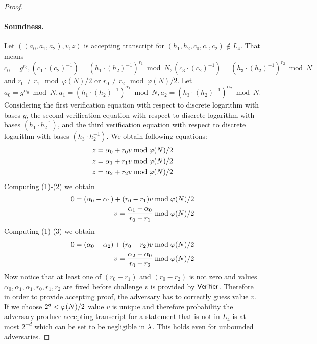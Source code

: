 \begin{proof}
\paragraph{Soundness.} Let $((a_0, a_1, a_2), v, z)$ is accepting transcript for $(h_1, h_2, c_0, c_1, c_2) \notin L_4$. That means $c_0 = g^{r_0}, (c_1\cdot (c_2)^{-1}) = (h_1\cdot (h_2)^{-1})^{r_1} \bmod N, (c_3\cdot (c_2)^{-1}) = (h_3\cdot (h_2)^{-1})^{r_2} \bmod N$ and $r_0 \neq r_1 \mod \varphi(N)/2$ or $r_0 \neq r_2 \mod \varphi(N)/2$. Let $a_0 = g^{\alpha_0} \bmod N, a_1 = (h_1\cdot (h_2)^{-1})^{\alpha_1} \bmod N, a_2 = (h_3\cdot (h_2)^{-1})^{\alpha_2} \bmod N$. Considering the first verification equation with respect to discrete logarithm with bases $g$, the second verification equation with respect to discrete logarithm with bases $(h_1 \cdot h_2^{-1})$, and the third verification equation with respect to discrete logarithm with bases $(h_3 \cdot h_2^{-1})$.  We obtain following equations:
\begin{align}
z = \alpha_0 + r_0 v \bmod \varphi(N)/2\\
z = \alpha_1 + r_1 v \bmod \varphi(N)/2 \\
z = \alpha_2 + r_2 v \bmod \varphi(N)/2
\end{align}
Computing (1)-(2) we obtain
\begin{align*}
0 = (\alpha_0 - \alpha_1)+ (r_0-r_1)v \bmod \varphi(N)/2 \\
v = \frac{\alpha_1 - \alpha_0}{r_0-r_1} \bmod \varphi(N)/2
\end{align*}
Computing (1)-(3) we obtain
\begin{align*}
0 = (\alpha_0 - \alpha_2)+ (r_0-r_2)v \bmod \varphi(N)/2 \\
v = \frac{\alpha_2 - \alpha_0}{r_0-r_2} \bmod \varphi(N)/2
\end{align*}
Now notice that at least one of $(r_0 - r_1)$ and $(r_0 - r_2)$ is not zero and values $\alpha_0, \alpha_1, \alpha_1, r_0, r_1, r_2$ are fixed before challenge $v$ is provided by $\mathsf{Verifier}$. Therefore in order to provide accepting proof, the adversary has to correctly guess value $v$. If we choose $2^d < \varphi(N)/2$ value $v$ is unique and therefore probability the adversary produce accepting transcript for a statement that is not in $L_4$ is at most $2^{-d}$ which can be set to be negligible in $\lambda$. This holds even for unbounded adversaries. 




\end{proof}
